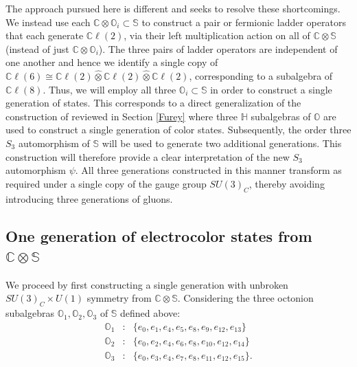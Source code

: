 \documentclass{article}
\newcommand{\bb}[1]{\mathbb{#1}}
\begin{document}
The approach pursued here is different and seeks to resolve these shortcomings. We instead use each $\bb{C}\otimes\bb{O}_i\subset \bb{S}$ to construct a pair or fermionic ladder operators that each generate $\bb{C}\ell(2)$, via their left multiplication action on all of $\bb{C}\otimes\bb{S}$ (instead of just $\bb{C}\otimes\bb{O}_i$). The three pairs of ladder operators are independent of one another and hence we identify a single copy of $\bb{C}\ell(6)\cong\bb{C}\ell(2)\hat{\otimes}\bb{C}\ell(2)\hat{\otimes}\bb{C}\ell(2)$, corresponding to a subalgebra of $\bb{C}\ell(8)$. Thus, we will employ all three $\bb{O}_i\subset \bb{S}$ in order to construct a single generation of states. This corresponds to a direct generalization of the construction of reviewed in Section \ref{Furey} where three $\bb{H}$ subalgebras of $\bb{O}$ are used to construct a single generation of color states. Subsequently, the order three $S_3$ automorphism of $\bb{S}$ will be used to generate two additional generations. This construction will therefore provide a clear interpretation of the new $S_3$ automorphism $\psi$. All three generations constructed in this manner transform as required under a single copy of the gauge group $SU(3)_C$, thereby avoiding introducing three generations of gluons.


\subsection{One generation of electrocolor states from $\bb{C}\otimes\bb{S}$}\label{onegenS}

We proceed by first constructing a single generation with unbroken $SU(3)_C\times U(1)$ symmetry from $\bb{C}\otimes\bb{S}$. Considering the three octonion subalgebras $\bb{O}_1,\bb{O}_2,\bb{O}_3$ of $\bb{S}$ defined above:
\begin{eqnarray}
\bb{O}_1&:& \{e_0,e_1,e_4,e_5,e_8,e_9,e_{12},e_{13}\}\\
\bb{O}_2&:& \{e_0,e_2,e_4,e_6,e_8,e_{10},e_{12},e_{14}\}\\
\bb{O}_3&:& \{e_0,e_3,e_4,e_7,e_8,e_{11},e_{12},e_{15}\}.
\end{eqnarray}
\end{document}
